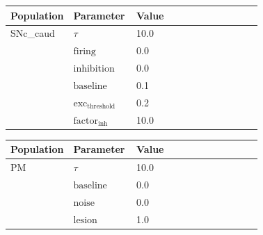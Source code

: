 \documentclass{article}
\begin{document}
\vspace{2ex}

\noindent
\begin{tabularx}{\linewidth}{|p{0.25\linewidth}|p{0.25\linewidth}|X|}\hline
\textbf{Population} & \textbf{Parameter} & \textbf{Value}   \\ \hline

    SNc\_caud             & $\tau$        & 10.0  \\ \hline

                 & ${\text{firing}}$        & 0.0  \\ \hline

                 & ${\text{inhibition}}$        & 0.0  \\ \hline

                 & ${\text{baseline}}$        & 0.1  \\ \hline

                 & ${\text{exc}}_{\text{threshold}}$        & 0.2  \\ \hline

                 & ${\text{factor}}_{\text{inh}}$        & 10.0  \\ \hline

\end{tabularx}

\vspace{2ex}

\noindent
\begin{tabularx}{\linewidth}{|p{0.25\linewidth}|p{0.25\linewidth}|X|}\hline
\textbf{Population} & \textbf{Parameter} & \textbf{Value}   \\ \hline

    PM             & $\tau$        & 10.0  \\ \hline

                 & ${\text{baseline}}$        & 0.0  \\ \hline

                 & ${\text{noise}}$        & 0.0  \\ \hline

                 & ${\text{lesion}}$        & 1.0  \\ \hline

\end{tabularx}

\vspace{2ex}
\end{document}
